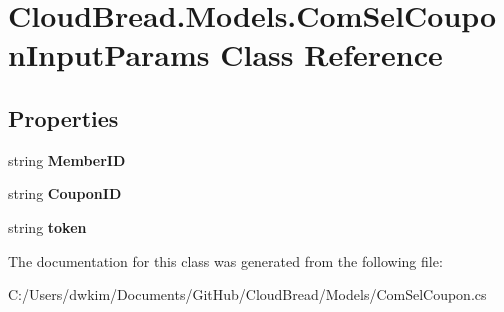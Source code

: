 \hypertarget{a00052}{}\section{Cloud\+Bread.\+Models.\+Com\+Sel\+Coupon\+Input\+Params Class Reference}
\label{a00052}
\subsection*{Properties}
\begin{DoxyCompactItemize}
\item 
string {\bfseries Member\+ID}\hypertarget{a00052_a5ac6c1ba8962b4af2efd997e47eed57d}{}\label{a00052_a5ac6c1ba8962b4af2efd997e47eed57d}

\item 
string {\bfseries Coupon\+ID}\hypertarget{a00052_a070672c01fb914192eddb491708e493b}{}\label{a00052_a070672c01fb914192eddb491708e493b}

\item 
string {\bfseries token}\hypertarget{a00052_ae5fba8b3131a6fdcb68042d138ee8f53}{}\label{a00052_ae5fba8b3131a6fdcb68042d138ee8f53}

\end{DoxyCompactItemize}


The documentation for this class was generated from the following file\+:\begin{DoxyCompactItemize}
\item 
C\+:/\+Users/dwkim/\+Documents/\+Git\+Hub/\+Cloud\+Bread/\+Models/Com\+Sel\+Coupon.\+cs\end{DoxyCompactItemize}
